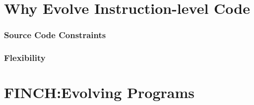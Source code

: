 \documentclass{beamer}
\begin{document}
\section[Why Instruction-level code]{Why Evolve Instruction-level Code}

\begin{frame}
	\frametitle{Source Code Constraints}
\end{frame}

\begin{frame}
	\frametitle{Flexibility}
\end{frame}

\section[FINCH]{FINCH:Evolving Programs}
\end{document}
